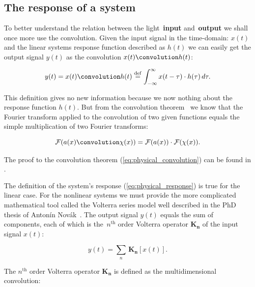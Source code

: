 \documentclass[12pt,twoside,a4paper]{article}
\numberwithin{equation}{subsection}
\numberwithin{figure}{subsection}
\begin{document}
\subsection{The response of a system} \label{chap:physical_systemresponse}

To better understand the relation between the light~\textbf{input} and~\textbf{output} we shall once more use the convolution.
Given the input signal in the time-domain: $ x(t) $ and the linear systems response function described as $ h(t) $ we can easily get the
output signal $ y(t) $ as the convolution $ x(t) \convolution h(t) $:

\begin{equation} \label{eq:physical_response}
  y(t) = x(t) \convolution h(t) \stackrel{\mathrm{def}}{=} \int_{ - \infty}^{ \infty} x( t - \tau ) \cdot h(\tau) \, d\tau .
\end{equation}

This definition gives no new information because we now nothing about the response function $ h(t) $. But from the convolution
theorem~\cite{katznelson_introduction} we know that the Fourier transform applied to the convolution of two given functions equals the
simple multiplication of two Fourier transforms:

\begin{equation} \label{eq:physical_convolution}
  \mathcal{F}(a(x) \convolution \chi(x)) = \mathcal{F}(a(x)) \cdot \mathcal{F}(\chi(x)) .
\end{equation}

The proof to the convolution theorem (\ref{eq:physical_convolution}) can be found in \cite{titchmarsh_introduction}.

The definition of the system's response (\ref{eq:physical_response}) is true for the linear case. For the nonlinear systems we must provide
the more complicated mathematical tool called the Volterra series model well described in the PhD thesis of Antonín
Novák~\cite{thesis_novak}. The output signal $ y(t) $ equals the sum of components, each of which is the~$ n ^ {\text{th}} $ order Volterra
operator $ \mathbf{K_n} $ of the input signal $ x(t) $:

\begin{equation} \label{eq:physical_volterraseries}
  y(t) = \sum_{n} \, \mathbf{K_n}[x (t) ].
\end{equation}

The $ n ^ {\text{th}} $ order Volterra operator $ \mathbf{K_n} $ is defined as the multidimensional convolution:
\end{document}
